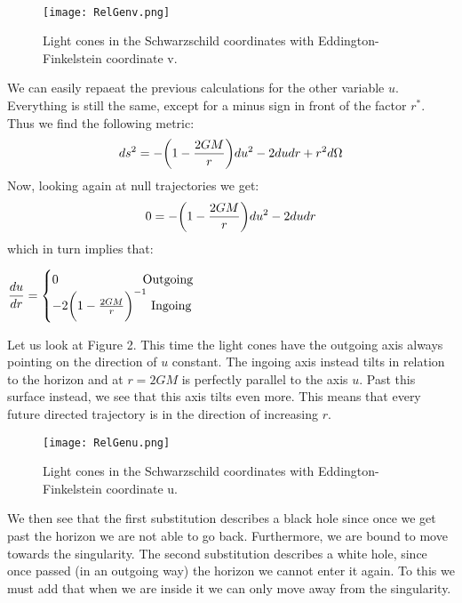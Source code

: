 \documentclass[]{article}
\theoremstyle{definition}
\theoremstyle{Theorem}
\theoremstyle{definition}
\theoremstyle{definition}
\theoremstyle{definition}
\begin{document}
\\
\begin{center}
	\begin{figure}[h!]
		\centering
		\texttt{[image: RelGenv.png]}
		\caption{Light cones in the Schwarzschild coordinates with Eddington-Finkelstein coordinate v.}
	\end{figure}
\end{center}
We can easily repaeat the previous calculations for the other variable $u$. Everything is still the same, except for a minus sign in front of the factor $r^*$. Thus we find the following metric:
$$ds^2=-\bigg(1-{2GM\over r}\bigg)du^2-2dudr+r^2d\Omega$$
Now, looking again at null trajectories we get:
$$0=-\bigg(1-{2GM\over r}\bigg)du^2-2dudr$$
which in turn implies that:
\begin{center}
	\begin{math}
		\displaystyle {du\over dr}=
		\begin{cases}
			0 \mbox{\hspace{68pt}Outgoing}\\
			-2\bigg(1-{2GM\over r}\bigg)^{-1} \mbox{  Ingoing}
		\end{cases}
	\end{math}
\end{center}
Let us look at Figure 2. This time the light cones have the outgoing axis always pointing on the direction of $u$ constant. The ingoing axis instead tilts in relation to the horizon and at $r=2GM$ is perfectly parallel to the axis $u$. Past this surface instead, we see that this axis tilts even more. This means that every future directed trajectory is in the direction of increasing $r$.
\begin{center}
	\begin{figure}[h!]
		\centering
		\texttt{[image: RelGenu.png]}
		\caption{Light cones in the Schwarzschild coordinates with Eddington-Finkelstein coordinate u.}
	\end{figure}
\end{center}
We then see that the first substitution describes a black hole since once we get past the horizon we are not able to go back. Furthermore, we are bound to move towards the singularity. The second substitution describes a white hole, since once passed (in an outgoing way) the horizon we cannot enter it again. To this we must add that when we are inside it we can only move away from the singularity.\\
\\
\end{document}
